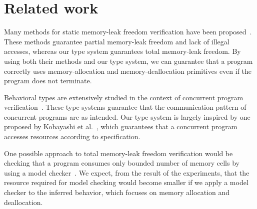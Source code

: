 
\section{Related work}\label{sec:relatedwork}
Many methods for static memory-leak freedom verification have been
proposed~\cite{DBLP:conf/aplas/SuenagaK09,DBLP:conf/pldi/HeineL03,DBLP:conf/sigsoft/XieA05,DBLP:journals/scp/SwamyHMGJ06,DBLP:conf/sas/OrlovichR06,DBLP:conf/issta/SuiYX12}. These
methods guarantee partial memory-leak freedom and lack of illegal
accesses, whereas our type system guarantees total memory-leak
freedom. By using both their methods and our type system, we can
guarantee that a program correctly uses memory-allocation and
memory-deallocation primitives even if the program does not terminate.

Behavioral types are extensively studied in the context of concurrent
program
verification~\cite{DBLP:conf/esop/HondaVK98,DBLP:journals/tcs/IgarashiK04,DBLP:conf/esop/VieiraCS08,DBLP:journals/lmcs/KobayashiSW06}.
These type systems guarantee that the communication pattern of
concurrent programs are as intended.  Our type system is largely
inspired by one proposed by Kobayashi et
al.~\cite{DBLP:journals/lmcs/KobayashiSW06}, which guarantees that a
concurrent program accesses resources according to specification.


One possible approach to total memory-leak freedom verification would
be checking that a program consumes only bounded number of memory
cells by using a model
checker~\cite{clarke1999model,ben2008principles,beyer2011cpachecker}.
We expect, from the result of the experiments, that the resource
required for model checking would become smaller if we apply a model
checker to the inferred behavior, which focuses on memory allocation
and deallocation.
